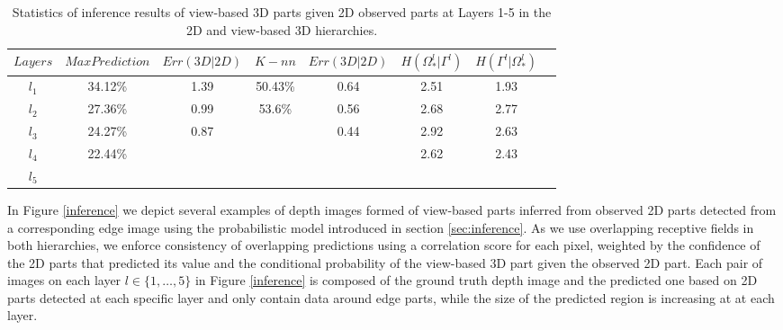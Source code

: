 \documentclass[runningheads]{llncs}
\begin{document}
 \begin{table}
 \begin{center}
  \begin{tabular}{ | c | c | c | c | c | c | c |r |}
      \hline
      $Layers$  & $Max Prediction$ & $Err(3D|2D)$ & $K-nn$ & $Err(3D|2D)$ & $H(\Omega_*^l|\Gamma^l)$ & $H(\Gamma^l|\Omega_*^l)$  \\ \hline
    $l_1$ &  34.12\% & 1.39 & 50.43\% & 0.64 & 2.51 & 1.93 \\ \hline
    $l_2$ &  27.36\% & 0.99 & 53.6\% & 0.56 & 2.68 & 2.77 \\ \hline
    $l_3$ &  24.27\% & 0.87 &  & 0.44 & 2.92 & 2.63 \\ \hline 
    $l_4$ &  22.44\% &  &  &  & 2.62 & 2.43 \\ \hline
    $l_5$ &   &  &  &  &  &  \\ 
    \hline
  \end{tabular}
\end{center}
\caption{Statistics of inference results of view-based 3D parts given 2D observed parts at Layers 1-5 in the 2D and view-based 3D hierarchies.}
\end{table}

In Figure \ref{inference} we depict several examples of depth images formed of view-based parts inferred from observed 2D parts detected from a corresponding edge image using the probabilistic model introduced in section \ref{sec:inference}. As we use overlapping receptive fields in both hierarchies, we enforce consistency of overlapping predictions using a correlation score for each pixel, weighted by the confidence of the 2D parts that predicted its value and the conditional probability of the view-based 3D part given the observed 2D part. Each pair of images on each layer $l\in\{1,\ldots,5\}$ in Figure \ref{inference} is composed of the ground truth depth image and the predicted one based on 2D parts detected at each specific layer and only contain data around edge parts, while the size of the predicted region is increasing at at each layer.
\end{document}

